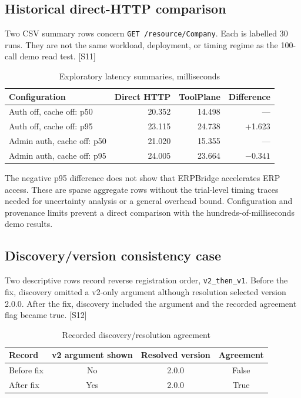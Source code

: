 \subsection*{Historical direct-HTTP comparison}
Two CSV summary rows concern \texttt{GET /resource/Company}. Each is labelled 30 runs. They are not the same workload, deployment, or timing regime as the 100-call demo read test. [S11]

\begin{table}[h]\caption{Exploratory latency summaries, milliseconds}\EvidenceTableStart
\begin{tabularx}{\linewidth}{@{}Xrrr@{}}\toprule
Configuration & Direct HTTP & ToolPlane & Difference\\\midrule
Auth off, cache off: p50 & 20.352 & 14.498 & ---\\
Auth off, cache off: p95 & 23.115 & 24.738 & +1.623\\
Admin auth, cache off: p50 & 21.020 & 15.355 & ---\\
Admin auth, cache off: p95 & 24.005 & 23.664 & $-0.341$\\\bottomrule
\end{tabularx}\end{table}

The negative p95 difference does not show that ERPBridge accelerates ERP access. These are sparse aggregate rows without the trial-level timing traces needed for uncertainty analysis or a general overhead bound. Configuration and provenance limits prevent a direct comparison with the hundreds-of-milliseconds demo results.

\subsection*{Discovery/version consistency case}
Two descriptive rows record reverse registration order, \texttt{v2\_then\_v1}. Before the fix, discovery omitted a v2-only argument although resolution selected version 2.0.0. After the fix, discovery included the argument and the recorded agreement flag became true. [S12]

\begin{table}[h]\caption{Recorded discovery/resolution agreement}\EvidenceTableStart
\begin{tabularx}{\linewidth}{@{}Xccc@{}}\toprule
Record & v2 argument shown & Resolved version & Agreement\\\midrule
Before fix & No & 2.0.0 & False\\
After fix & Yes & 2.0.0 & True\\\bottomrule
\end{tabularx}\end{table}

